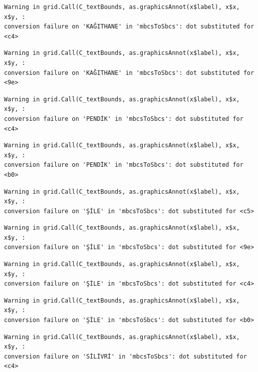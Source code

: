\documentclass[
  11pt,
  a4paper,
  DIV=11,
  numbers=noendperiod]{scrartcl}
\begin{document}
\begin{verbatim}
Warning in grid.Call(C_textBounds, as.graphicsAnnot(x$label), x$x, x$y, :
conversion failure on 'KAĞITHANE' in 'mbcsToSbcs': dot substituted for <c4>
\end{verbatim}

\begin{verbatim}
Warning in grid.Call(C_textBounds, as.graphicsAnnot(x$label), x$x, x$y, :
conversion failure on 'KAĞITHANE' in 'mbcsToSbcs': dot substituted for <9e>
\end{verbatim}

\begin{verbatim}
Warning in grid.Call(C_textBounds, as.graphicsAnnot(x$label), x$x, x$y, :
conversion failure on 'PENDİK' in 'mbcsToSbcs': dot substituted for <c4>
\end{verbatim}

\begin{verbatim}
Warning in grid.Call(C_textBounds, as.graphicsAnnot(x$label), x$x, x$y, :
conversion failure on 'PENDİK' in 'mbcsToSbcs': dot substituted for <b0>
\end{verbatim}

\begin{verbatim}
Warning in grid.Call(C_textBounds, as.graphicsAnnot(x$label), x$x, x$y, :
conversion failure on 'ŞİLE' in 'mbcsToSbcs': dot substituted for <c5>
\end{verbatim}

\begin{verbatim}
Warning in grid.Call(C_textBounds, as.graphicsAnnot(x$label), x$x, x$y, :
conversion failure on 'ŞİLE' in 'mbcsToSbcs': dot substituted for <9e>
\end{verbatim}

\begin{verbatim}
Warning in grid.Call(C_textBounds, as.graphicsAnnot(x$label), x$x, x$y, :
conversion failure on 'ŞİLE' in 'mbcsToSbcs': dot substituted for <c4>
\end{verbatim}

\begin{verbatim}
Warning in grid.Call(C_textBounds, as.graphicsAnnot(x$label), x$x, x$y, :
conversion failure on 'ŞİLE' in 'mbcsToSbcs': dot substituted for <b0>
\end{verbatim}

\begin{verbatim}
Warning in grid.Call(C_textBounds, as.graphicsAnnot(x$label), x$x, x$y, :
conversion failure on 'SİLİVRİ' in 'mbcsToSbcs': dot substituted for <c4>
\end{verbatim}
\end{document}
